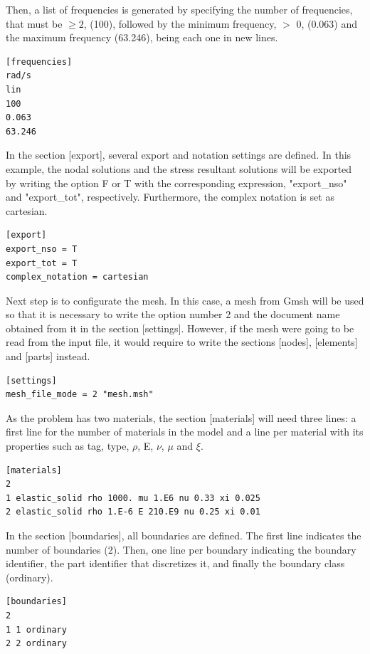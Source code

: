 \documentclass[a4]{article}
\begin{document}
Then, a list of frequencies is generated by specifying the number of frequencies, that must be $\geq 2$, (100), followed by the minimum frequency, $>$ 0, (0.063) and the maximum frequency (63.246), being each one in new lines.

\begin{Verbatim}
[frequencies]
rad/s
lin
100
0.063
63.246
\end{Verbatim}

In the section [export], several export and notation settings are defined. In this example, the nodal solutions and the stress resultant solutions will be exported by writing the option F or T with the corresponding expression, "export\_nso" and "export\_tot", respectively. Furthermore, the complex notation is set as cartesian. 

\begin{Verbatim}
[export]
export_nso = T
export_tot = T
complex_notation = cartesian
\end{Verbatim}

Next step is to configurate the mesh. In this case, a mesh from Gmsh will be used so that it is necessary to write the option number 2 and the document name obtained from it in the section [settings]. However, if the mesh were going to be read from the input file, it would require to write the sections [nodes], [elements] and [parts] instead.

\begin{Verbatim}	
[settings]
mesh_file_mode = 2 "mesh.msh"
\end{Verbatim}

As the problem has two materials, the section [materials] will need three lines: a first line for the number of materials in the model and a line per material with its properties such as tag, type, $\rho$, E, $\nu$, $\mu$ and $ \xi $.

\begin{Verbatim}
[materials]
2
1 elastic_solid rho 1000. mu 1.E6 nu 0.33 xi 0.025
2 elastic_solid rho 1.E-6 E 210.E9 nu 0.25 xi 0.01
\end{Verbatim}

In the section [boundaries], all boundaries are defined. The first line indicates the number of boundaries (2). Then, one line per boundary indicating the boundary identifier, the part identifier that discretizes it, and finally the boundary class (ordinary).

\begin{Verbatim}
[boundaries]
2
1 1 ordinary
2 2 ordinary
\end{Verbatim}
\end{document}
